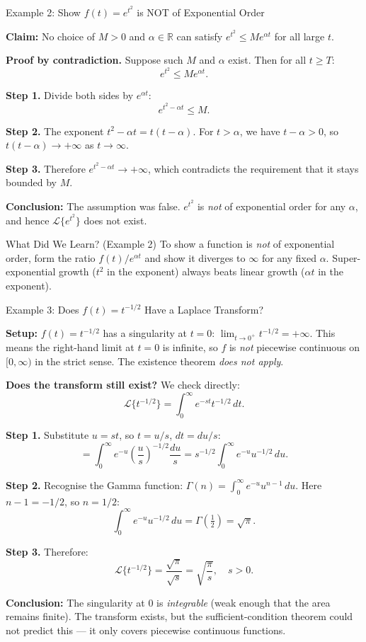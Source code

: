 \documentclass[12pt,a4paper]{article}
\begin{document}
\begin{infobox}{Example 2: Show $f(t) = e^{t^2}$ is NOT of Exponential Order}

\textbf{Claim:} No choice of $M > 0$ and $\alpha \in \mathbb{R}$ can satisfy $e^{t^2} \leq M e^{\alpha t}$ for all large $t$.

\textbf{Proof by contradiction.} Suppose such $M$ and $\alpha$ exist. Then for all $t \geq T$:
\[
  e^{t^2} \leq M e^{\alpha t}.
\]

\textbf{Step 1.} Divide both sides by $e^{\alpha t}$:
\[
  e^{t^2 - \alpha t} \leq M.
\]

\textbf{Step 2.} The exponent $t^2 - \alpha t = t(t - \alpha)$. For $t > \alpha$, we have $t - \alpha > 0$, so $t(t-\alpha) \to +\infty$ as $t \to \infty$.

\textbf{Step 3.} Therefore $e^{t^2 - \alpha t} \to +\infty$, which contradicts the requirement that it stays bounded by $M$.

\textbf{Conclusion:} The assumption was false. $e^{t^2}$ is \emph{not} of exponential order for any $\alpha$, and hence $\mathcal{L}\{e^{t^2}\}$ does not exist.
\end{infobox}

\begin{learnbox}{What Did We Learn? (Example 2)}
To show a function is \emph{not} of exponential order, form the ratio $f(t)/e^{\alpha t}$ and show it diverges to $\infty$ for any fixed $\alpha$. Super-exponential growth ($t^2$ in the exponent) always beats linear growth ($\alpha t$ in the exponent).
\end{learnbox}

\begin{infobox}{Example 3: Does $f(t) = t^{-1/2}$ Have a Laplace Transform?}

\textbf{Setup:} $f(t) = t^{-1/2}$ has a singularity at $t = 0$: $\lim_{t \to 0^+} t^{-1/2} = +\infty$. This means the right-hand limit at $t = 0$ is infinite, so $f$ is \emph{not} piecewise continuous on $[0, \infty)$ in the strict sense. The existence theorem \emph{does not apply}.

\textbf{Does the transform still exist?} We check directly:
\[
  \mathcal{L}\{t^{-1/2}\} = \int_0^{\infty} e^{-st} t^{-1/2}\, dt.
\]

\textbf{Step 1.} Substitute $u = st$, so $t = u/s$, $dt = du/s$:
\[
  = \int_0^{\infty} e^{-u} \left(\frac{u}{s}\right)^{-1/2} \frac{du}{s} = s^{-1/2} \int_0^{\infty} e^{-u} u^{-1/2}\, du.
\]

\textbf{Step 2.} Recognise the Gamma function: $\Gamma(n) = \int_0^{\infty} e^{-u} u^{n-1}\, du$. Here $n - 1 = -1/2$, so $n = 1/2$:
\[
  \int_0^{\infty} e^{-u} u^{-1/2}\, du = \Gamma\!\left(\tfrac{1}{2}\right) = \sqrt{\pi}.
\]

\textbf{Step 3.} Therefore:
\[
  \mathcal{L}\{t^{-1/2}\} = \frac{\sqrt{\pi}}{\sqrt{s}} = \sqrt{\frac{\pi}{s}}, \quad s > 0.
\]

\textbf{Conclusion:} The singularity at 0 is \emph{integrable} (weak enough that the area remains finite). The transform exists, but the sufficient-condition theorem could not predict this --- it only covers piecewise continuous functions.
\end{infobox}
\end{document}

